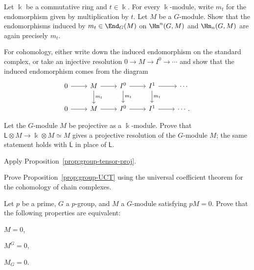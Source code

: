 
\begin{Exercises}
	\item Let $\Bbbk$ be a commutative ring and $t\in\Bbbk$. For every
	$\Bbbk$-module, write $m_t$ for the endomorphism given by multiplication
	by $t$. Let $M$ be a $G$-module. Show that the endomorphisms induced by
	$m_t\in\End_G(M)$ on $\Hm^n(G,M)$ and $\Hm_n(G,M)$ are again precisely
	$m_t$.

	\begin{hint}
		For cohomology, either write down the induced endomorphism on the
		standard complex, or take an injective resolution
		$0\to M\to I^0\to\cdots$ and show that the induced endomorphism comes
		from the diagram
		\[\begin{tikzcd}
			0 \arrow[r] & M \arrow[r] \arrow[d,"{m_t}"] &
			I^0 \arrow[r] \arrow[d,"{m_t}"] &
			I^1 \arrow[r] \arrow[d,"{m_t}"] & \cdots\\
			0 \arrow[r] & M \arrow[r] & I^0 \arrow[r] & I^1 \arrow[r] & \cdots.
		\end{tikzcd}\]
	\end{hint}

	\item Let the $G$-module $M$ be projective as a $\Bbbk$-module. Prove
	that $\mathsf{L}\otimes M\to\Bbbk\otimes M\simeq M$ gives a projective
	resolution of the $G$-module $M$; the same statement holds with
	$\overline{\mathsf{L}}$ in place of $\mathsf{L}$.

	\begin{hint}
		Apply Proposition~\ref{prop:group-tensor-proj}.
	\end{hint}

	\item Prove Proposition~\ref{prop:group-UCT} using the universal
	coefficient theorem for the cohomology of chain complexes.


	\item Let $p$ be a prime, $G$ a $p$-group, and $M$ a $G$-module
	satisfying $pM=0$. Prove that the following properties are equivalent:
	\begin{inparaenum}[(i)]
		\item $M=0$,
		\item $M^G=0$,
		\item $M_G=0$.
	\end{inparaenum}


\end{Exercises}

